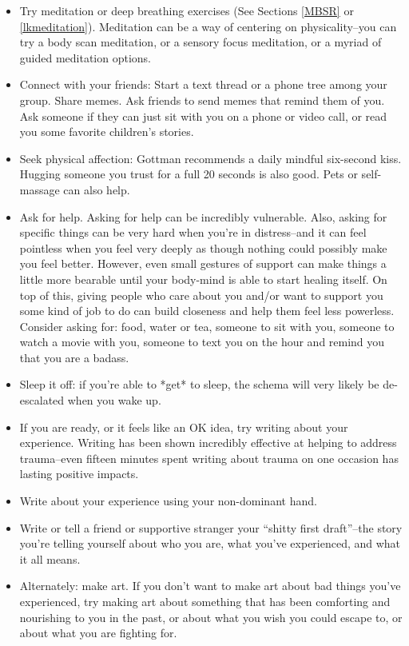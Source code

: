 \documentclass[12pt,letterpaper]{article}
\begin{document}
\begin{itemize}
    \item Try meditation or deep breathing exercises (See Sections \ref{MBSR} or \ref{lkmeditation}). Meditation can be a way of centering on physicality--you can try a body scan meditation, or a sensory focus meditation, or a myriad of guided meditation options.
    \item Connect with your friends: Start a text thread or a phone tree among your group. Share memes. Ask friends to send memes that remind them of you. Ask someone if they can just sit with you on a phone or video call, or read you some favorite children's stories.
    \item Seek physical affection: Gottman recommends a daily mindful six-second kiss. Hugging someone you trust for a full 20 seconds is also good. Pets or self-massage can also help.
    \item Ask for help. Asking for help can be incredibly vulnerable. Also, asking for specific things can be very hard when you're in distress--and it can feel pointless when you feel very deeply as though nothing could possibly make you feel better. However, even small gestures of support can make things a little more bearable until your body-mind is able to start healing itself. On top of this, giving people who care about you and/or want to support you some kind of job to do can build closeness and help them feel less powerless. Consider asking for: food, water or tea, someone to sit with you, someone to watch a movie with you, someone to text you on the hour and remind you that you are a badass.
    \item Sleep it off: if you're able to *get* to sleep, the schema will very likely be de-escalated when you wake up.
    \item If you are ready, or it feels like an OK idea, try writing about your experience. Writing has been shown incredibly effective at helping to address trauma--even fifteen minutes spent writing about trauma on one occasion has lasting positive impacts.
    \item Write about your experience using your non-dominant hand.
    \item Write or tell a friend or supportive stranger your “shitty first draft”--the story you're telling yourself about who you are, what you've experienced, and what it all means.
    \item Alternately: make art. If you don't want to make art about bad things you've experienced, try making art about something that has been comforting and nourishing to you in the past, or about what you wish you could escape to, or about what you are fighting for.

\end{itemize}
\end{document}
